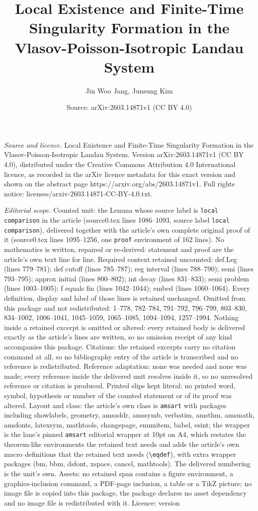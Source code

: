 \documentclass[10pt,a4paper]{amsart}
\title[Local Existence and Finite-Time Singularity Formation in the]{Local Existence and Finite-Time Singularity Formation in the Vlasov-Poisson-Isotropic Landau System}
\author{Jin Woo Jang, Junsung Kim}
\date{Source: arXiv:2603.14871v1 (CC BY 4.0)}
\begin{document}
\maketitle

\noindent\emph{Source and licence.} Local Existence and Finite-Time Singularity Formation in the Vlasov-Poisson-Isotropic Landau System. Version arXiv:2603.14871v1 (CC BY 4.0), distributed under the Creative Commons Attribution 4.0 International licence, as recorded in the arXiv licence metadata for this exact version and shown on the abstract page https://arxiv.org/abs/2603.14871v1. Full rights notice: licenses/arxiv-2603.14871-CC-BY-4.0.txt.\par\smallskip

\noindent\textit{Editorial scope.} Counted unit: the Lemma whose source label is \texttt{local comparison} in the article (source0.tex lines 1086--1093, source label \texttt{local comparison}), delivered together with the article's own complete original proof of it (source0.tex lines 1095--1256, one \texttt{proof} environment of 162 lines). No mathematics is written, repaired or re-derived: statement and proof are the article's own text line for line. Required context retained uncounted: def.Leg (lines 779--781); def cutoff (lines 785--787); reg interval (lines 788--790); semi (lines 793--795); approx initial (lines 800--802); int decay (lines 831--833); semi problem (lines 1003--1005); f equals fin (lines 1042--1044); embed (lines 1060--1064). Every definition, display and label of those lines is retained unchanged. Omitted from this package and not redistributed: 1--778, 782--784, 791--792, 796--799, 803--830, 834--1002, 1006--1041, 1045--1059, 1065--1085, 1094--1094, 1257--1994. Nothing inside a retained excerpt is omitted or altered: every retained body is delivered exactly as the article's lines are written, so no omission receipt of any kind accompanies this package. Citations: the retained excerpts carry no citation command at all, so no bibliography entry of the article is transcribed and no reference is redistributed. Reference adaptation: none was needed and none was made; every reference inside the delivered unit resolves inside it, so no unresolved reference or citation is produced. Printed slips kept literal: no printed word, symbol, hypothesis or number of the counted statement or of its proof was altered. Layout and class: the article's own class is \texttt{amsart} with packages including showlabels, geometry, amsaddr, amssymb, verbatim, amsthm, amsmath, amsfonts, latexsym, mathtools, changepage, enumitem, babel, esint; the wrapper is the lane's pinned \texttt{amsart} editorial wrapper at 10pt on A4, which restates the theorem-like environments the retained text needs and adds the article's own macro definitions that the retained text needs (\texttt{\textbackslash eqdef}), with extra wrapper packages (bm, bbm, dsfont, xspace, cancel, mathtools). The delivered numbering is the unit's own. Assets: no retained span contains a figure environment, a graphics-inclusion command, a PDF-page inclusion, a table or a TikZ picture; no image file is copied into this package, the package declares no asset dependency and no image file is redistributed with it. Licence: version 
\end{document}
